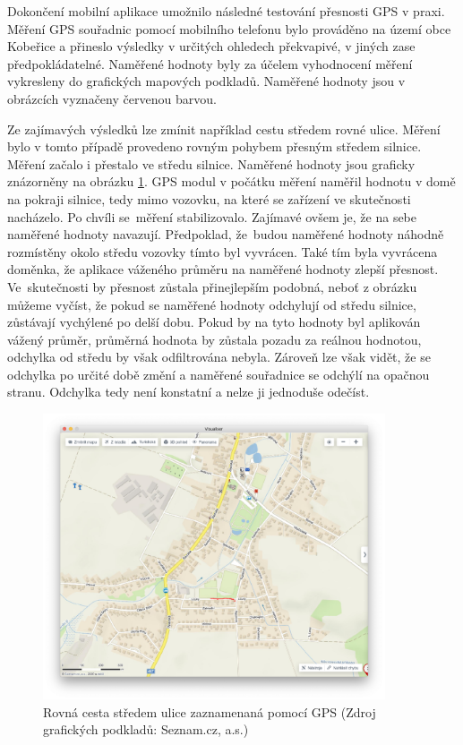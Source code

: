 \documentclass[czech, bachelor]{diploma}
\begin{document}
Dokončení mobilní aplikace umožnilo následné testování přesnosti GPS v praxi. Měření GPS souřadnic pomocí mobilního telefonu bylo
prováděno na území obce Kobeřice a přineslo výsledky v určitých ohledech překvapivé, v jiných zase předpokládatelné. Naměřené
hodnoty byly za účelem vyhodnocení měření vykresleny do grafických mapových podkladů. Naměřené hodnoty jsou v obrázcích vyznačeny
červenou barvou.

Ze zajímavých výsledků lze zmínit například cestu středem rovné ulice. Měření bylo v tomto případě provedeno rovným pohybem
přesným středem silnice. Měření začalo i přestalo ve středu silnice. Naměřené hodnoty jsou graficky znázorněny na obrázku
\ref{fig:louky}. GPS modul v počátku měření naměřil hodnotu v domě na pokraji silnice, tedy mimo vozovku, na které se zařízení
ve skutečnosti nacházelo. Po chvíli se~měření stabilizovalo. Zajímavé ovšem je, že na sebe naměřené hodnoty navazují. Předpoklad,
že~budou naměřené hodnoty náhodně rozmístěny okolo středu vozovky tímto byl vyvrácen. Také tím byla vyvrácena doměnka, že aplikace
váženého průměru na naměřené hodnoty zlepší přesnost. Ve~skutečnosti by přesnost zůstala přinejlepším podobná, neboť z obrázku
můžeme vyčíst, že pokud se naměřené hodnoty odchylují od středu silnice, zůstávají vychýlené po delší dobu. Pokud by na tyto
hodnoty byl aplikován vážený průměr, průměrná hodnota by zůstala pozadu za reálnou hodnotou, odchylka od středu by však
odfiltrována nebyla. Zároveň lze však vidět, že se odchylka po určité době změní a naměřené souřadnice se odchýlí na opačnou
stranu. Odchylka tedy není konstatní a nelze ji jednoduše odečíst.

\begin{figure}
    \centering
    \includegraphics[width=0.9\textwidth]{Figures/louky.png}
    \caption{Rovná cesta středem ulice zaznamenaná pomocí GPS (Zdroj grafických podkladů: Seznam.cz, a.s.)}
    \label{fig:louky}
\end{figure}
\end{document}
